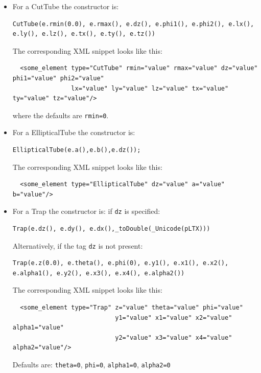 \begin{itemize}
\item For a CutTube the constructor is:
\begin{verbatim}
CutTube(e.rmin(0.0), e.rmax(), e.dz(), e.phi1(), e.phi2(), e.lx(), e.ly(), e.lz(), e.tx(), e.ty(), e.tz())
\end{verbatim}
The corresponding XML snippet looks like this:
\begin{verbatim}
  <some_element type="CutTube" rmin="value" rmax="value" dz="value" phi1="value" phi2="value"
                lx="value" ly="value" lz="value" tx="value" ty="value" tz="value"/>
\end{verbatim}
where the defaults are \texttt{rmin=0}.

\item For a EllipticalTube the constructor is:
\begin{verbatim}
EllipticalTube(e.a(),e.b(),e.dz());
\end{verbatim}
The corresponding XML snippet looks like this:
\begin{verbatim}
  <some_element type="EllipticalTube" dz="value" a="value" b="value"/>
\end{verbatim}

\item For a Trap the constructor is: if \texttt{dz} is specified: 
\begin{verbatim}
Trap(e.dz(), e.dy(), e.dx(),_toDouble(_Unicode(pLTX)))
\end{verbatim}
Alternatively, if the tag  \texttt{dz} is not present: 
\begin{verbatim}
Trap(e.z(0.0), e.theta(), e.phi(0), e.y1(), e.x1(), e.x2(), e.alpha1(), e.y2(), e.x3(), e.x4(), e.alpha2())
\end{verbatim}
The corresponding XML snippet looks like this:
\begin{verbatim}
  <some_element type="Trap" z="value" theta="value" phi="value"
                            y1="value" x1="value" x2="value" alpha1="value"
                            y2="value" x3="value" x4="value" alpha2="value"/>
\end{verbatim}
Defaults are: \texttt{theta=0},  \texttt{phi=0},  \texttt{alpha1=0},  \texttt{alpha2=0}


\end{itemize}
